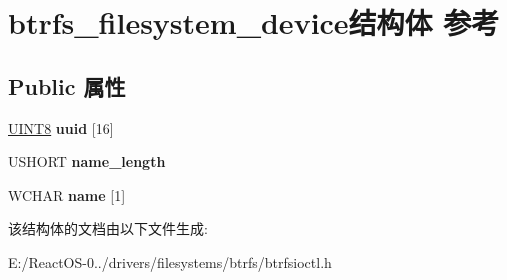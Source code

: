 \hypertarget{structbtrfs__filesystem__device}{}\section{btrfs\+\_\+filesystem\+\_\+device结构体 参考}
\label{structbtrfs__filesystem__device}
\subsection*{Public 属性}
\begin{DoxyCompactItemize}
\item 
\mbox{\label{structbtrfs__filesystem__device_ab91e005b144fa8a749844d86406e65a6}} 
\hyperlink{_processor_bind_8h_ab27e9918b538ce9d8ca692479b375b6a}{U\+I\+N\+T8} {\bfseries uuid} \mbox{[}16\mbox{]}
\item 
\mbox{\label{structbtrfs__filesystem__device_afd5e11b67180eb573da0fe216d91ca0c}} 
U\+S\+H\+O\+RT {\bfseries name\+\_\+length}
\item 
\mbox{\label{structbtrfs__filesystem__device_a02cca77dc5b71bdea0eb68094aaf54ca}} 
W\+C\+H\+AR {\bfseries name} \mbox{[}1\mbox{]}
\end{DoxyCompactItemize}


该结构体的文档由以下文件生成\+:\begin{DoxyCompactItemize}
\item 
E\+:/\+React\+O\+S-\/0../drivers/filesystems/btrfs/btrfsioctl.\+h\end{DoxyCompactItemize}
